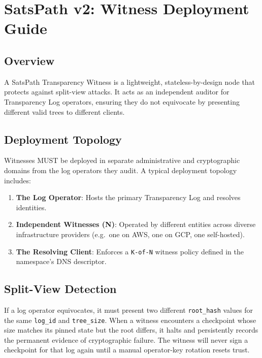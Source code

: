 \documentclass[
]{article}
\author{}
\date{}
\providecommand{\tightlist}{%
  \setlength{\itemsep}{0pt}\setlength{\parskip}{0pt}}
\begin{document}
\hypertarget{satspath-v2-witness-deployment-guide}{%
\section{SatsPath v2: Witness Deployment
Guide}\label{satspath-v2-witness-deployment-guide}}

\hypertarget{overview}{%
\subsection{Overview}\label{overview}}

A SatsPath Transparency Witness is a lightweight, stateless-by-design
node that protects against split-view attacks. It acts as an independent
auditor for Transparency Log operators, ensuring they do not equivocate
by presenting different valid trees to different clients.

\hypertarget{deployment-topology}{%
\subsection{Deployment Topology}\label{deployment-topology}}

Witnesses MUST be deployed in separate administrative and cryptographic
domains from the log operators they audit. A typical deployment topology
includes:

\begin{enumerate}
\def\labelenumi{\arabic{enumi}.}
\tightlist
\item
  \textbf{The Log Operator}: Hosts the primary Transparency Log and
  resolves identities.
\item
  \textbf{Independent Witnesses (N)}: Operated by different entities
  across diverse infrastructure providers (e.g.~one on AWS, one on GCP,
  one self-hosted).
\item
  \textbf{The Resolving Client}: Enforces a \texttt{K-of-N} witness
  policy defined in the namespace's DNS descriptor.
\end{enumerate}

\hypertarget{split-view-detection}{%
\subsection{Split-View Detection}\label{split-view-detection}}

If a log operator equivocates, it must present two different
\texttt{root\_hash} values for the same \texttt{log\_id} and
\texttt{tree\_size}. When a witness encounters a checkpoint whose size
matches its pinned state but the root differs, it halts and persistently
records the permanent evidence of cryptographic failure. The witness
will never sign a checkpoint for that log again until a manual
operator-key rotation resets trust.
\end{document}
